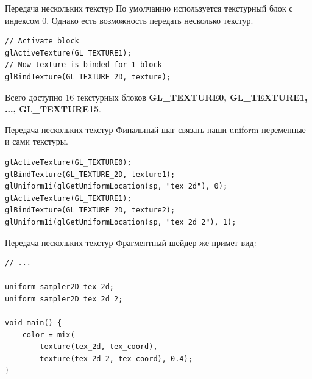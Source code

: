 \documentclass[aspectration=1610,t]{beamer}
\begin{document}
\begin{frame}[fragile]{Передача нескольких текстур}
    По умолчанию используется текстурный блок с индексом 0. Однако есть возможность передать несколько текстур.
    {\small \begin{lstlisting}
// Activate block
glActiveTexture(GL_TEXTURE1);
// Now texture is binded for 1 block
glBindTexture(GL_TEXTURE_2D, texture);
    \end{lstlisting}}
    Всего доступно 16 текстурных блоков {\bf GL\_TEXTURE0, GL\_TEXTURE1, ..., GL\_TEXTURE15}.
\end{frame}

\begin{frame}[fragile]{Передача нескольких текстур}
    Финальный шаг связать наши uniform-переменные и сами текстуры.
    {\small \begin{lstlisting}
glActiveTexture(GL_TEXTURE0);
glBindTexture(GL_TEXTURE_2D, texture1);
glUniform1i(glGetUniformLocation(sp, "tex_2d"), 0);
glActiveTexture(GL_TEXTURE1);
glBindTexture(GL_TEXTURE_2D, texture2);
glUniform1i(glGetUniformLocation(sp, "tex_2d_2"), 1);
    \end{lstlisting}}
\end{frame}

\begin{frame}[fragile]{Передача нескольких текстур}
    Фрагментный шейдер же примет вид:
    {\small \begin{lstlisting}
// ...

uniform sampler2D tex_2d;
uniform sampler2D tex_2d_2;

void main() {
    color = mix(
        texture(tex_2d, tex_coord),
        texture(tex_2d_2, tex_coord), 0.4);
}
    \end{lstlisting}}
\end{frame}
\end{document}
